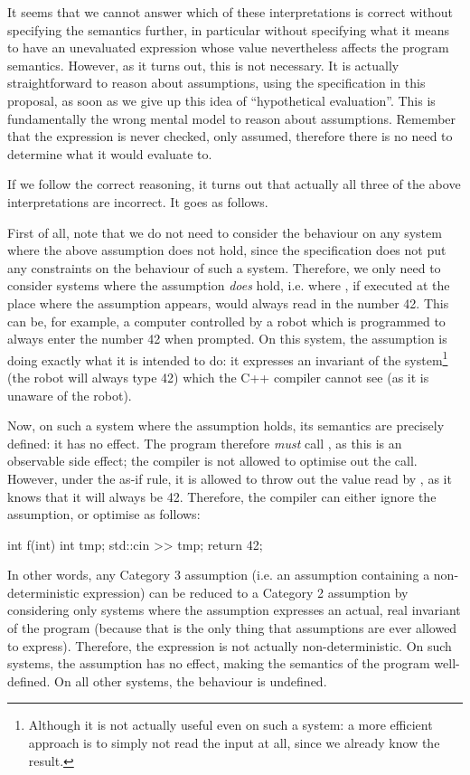 It seems that we cannot answer which of these interpretations is correct without specifying the semantics further, in particular without specifying what it means to have an unevaluated expression whose value nevertheless affects the program semantics. However, as it turns out, this is not necessary. It is actually straightforward to reason about assumptions, using the specification in this proposal, as soon as we give up this idea of ``hypothetical evaluation''. This is fundamentally the wrong mental model to reason about assumptions. Remember that the expression is never checked, only assumed, therefore there is no need to determine what it would evaluate to.

If we follow the correct reasoning, it turns out that actually all three of the above interpretations are incorrect. It goes as follows.

First of all, note that we do not need to consider the behaviour on any system where the above assumption does not hold, since the specification does not put any constraints on the behaviour of such a system. Therefore, we only need to consider systems where the assumption \emph{does} hold, i.e. where , if executed at the place where the assumption appears, would always read in the number 42. This can be, for example, a computer controlled by a robot which is programmed to always enter the number 42 when prompted. On this system, the assumption is doing exactly what it is intended to do: it expresses an invariant of the system\footnote{Although it is not actually useful even on such a system: a more efficient approach is to simply not read the input at all, since we already know the result.} (the robot will always type 42) which the C++ compiler cannot see (as it is unaware of the robot).

Now, on such a system where the assumption holds, its semantics are precisely defined: it has no effect. The program therefore \emph{must} call , as this is an observable side effect; the compiler is not allowed to optimise out the call. However, under the as-if rule, it is allowed to throw out the value read by , as it knows that it will always be 42. Therefore, the compiler can either ignore the assumption, or optimise  as follows:
\begin{codeblock}
int f(int) {
  int tmp;
  std::cin >> tmp;
  return 42;
}
\end{codeblock}

In other words, any Category 3 assumption (i.e. an assumption containing a non-deterministic expression) can be reduced to a Category 2 assumption by considering only systems where the assumption expresses an actual, real invariant of the program (because that is the only thing that assumptions are ever allowed to express). Therefore, the expression is not actually non-deterministic. On such systems, the assumption has no effect, making the semantics of the program well-defined. On all other systems, the behaviour is undefined.

